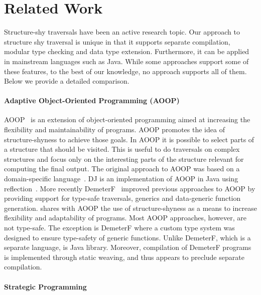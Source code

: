 \section{Related Work}\label{sec:related}


Structure-shy traversals have been an active research topic.  Our
approach to structure shy traversal is unique in that it supports
separate compilation, modular type checking and data type
extension. Furthermore, it can be applied in mainstream languages such
as Java. While some approaches support some of these features, to the
best of our knowledge, no approach supports all of them.  Below we
provide a detailed comparison.

\paragraph{Adaptive Object-Oriented Programming (AOOP)}
AOOP~\cite{DemeterBook} is an extension of object-oriented programming
aimed at increasing the flexibility and maintainability of
programs. AOOP promotes the idea of structure-shyness to achieve those
goals. In AOOP it is possible to select parts of a structure that
should be visited. This is useful to do traversals on complex
structures and focus only on the interesting parts of the structure
relevant for computing the final output. The original approach to AOOP
was based on a domain-specific language~\cite{DemeterBook}. DJ is an
implementation of AOOP in Java using reflection~\cite{DJ}. More
recently DemeterF~\cite{OOGP} improved previous approaches to AOOP by
providing support for type-safe traversals, generics and data-generic
function generation. \name shares with AOOP the use of
structure-shyness as a means to increase flexibility and adaptability
of programs.  Most AOOP approaches, however, are not type-safe. The
exception is DemeterF where a custom type system was designed to
ensure type-safety of generic functions. Unlike DemeterF, which is a
separate language, \name is Java library.  Moreover, compilation of
DemeterF programs is implemented through static weaving, and thus appears to
preclude separate compilation.

\paragraph{Strategic Programming}

